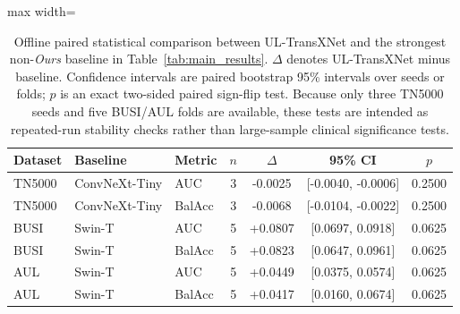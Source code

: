 \begin{table}[t]
    \centering
    \small
    \caption{Offline paired statistical comparison between UL-TransXNet and the strongest non-\textit{Ours} baseline in Table~\ref{tab:main_results}. $\Delta$ denotes UL-TransXNet minus baseline. Confidence intervals are paired bootstrap 95\% intervals over seeds or folds; $p$ is an exact two-sided paired sign-flip test. Because only three TN5000 seeds and five BUSI/AUL folds are available, these tests are intended as repeated-run stability checks rather than large-sample clinical significance tests.}
    \label{tab:paired_statistical_tests}
    \begin{adjustbox}{max width=\columnwidth}
    \begin{tabular}{lllcccc}
        \toprule
        Dataset & Baseline & Metric & $n$ & $\Delta$ & 95\% CI & $p$ \\
        \midrule
        TN5000 & ConvNeXt-Tiny & AUC & 3 & -0.0025 & [-0.0040, -0.0006] & 0.2500 \\
        TN5000 & ConvNeXt-Tiny & BalAcc & 3 & -0.0068 & [-0.0104, -0.0022] & 0.2500 \\
        \midrule
        BUSI & Swin-T & AUC & 5 & +0.0807 & [0.0697, 0.0918] & 0.0625 \\
        BUSI & Swin-T & BalAcc & 5 & +0.0823 & [0.0647, 0.0961] & 0.0625 \\
        \midrule
        AUL & Swin-T & AUC & 5 & +0.0449 & [0.0375, 0.0574] & 0.0625 \\
        AUL & Swin-T & BalAcc & 5 & +0.0417 & [0.0160, 0.0674] & 0.0625 \\
        \bottomrule
    \end{tabular}
    \end{adjustbox}
\end{table}
